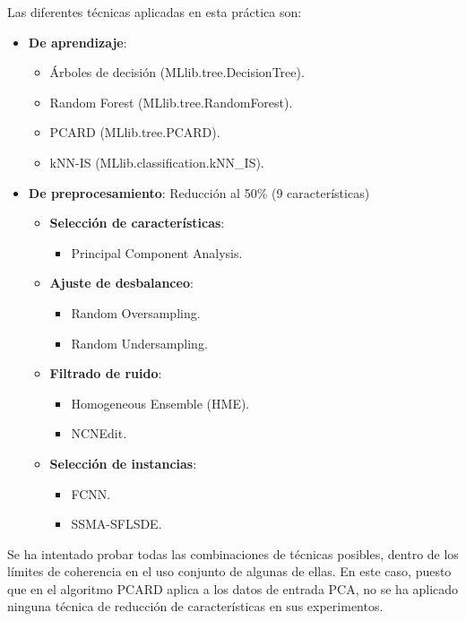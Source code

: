 Las diferentes técnicas aplicadas en esta práctica son:
\begin{itemize}
    \item \textbf{De aprendizaje}: \begin{itemize}
        \item Árboles de decisión (MLlib.tree.DecisionTree).
        \item Random Forest (MLlib.tree.RandomForest).
        \item PCARD (MLlib.tree.PCARD).
        \item kNN-IS (MLlib.classification.kNN\_IS).
    \end{itemize}
    \item \textbf{De preprocesamiento}: Reducción al 50\% (9 características)\begin{itemize}
        \item \textbf{Selección de características}: \begin{itemize}
            \item Principal Component Analysis.
        \end{itemize}
        \item \textbf{Ajuste de desbalanceo}: \begin{itemize}
            \item Random Oversampling.
            \item Random Undersampling.
        \end{itemize}
        \item \textbf{Filtrado de ruido}: \begin{itemize}
            \item Homogeneous Ensemble (HME).
            \item NCNEdit.
        \end{itemize}
        \item \textbf{Selección de instancias}: \begin{itemize}
            \item FCNN.
            \item SSMA-SFLSDE.
        \end{itemize}
    \end{itemize}
\end{itemize}


Se ha intentado probar todas las combinaciones de técnicas posibles, dentro de los límites de coherencia en el uso conjunto de algunas de ellas. En este caso, puesto que en el algoritmo PCARD aplica a los datos de entrada PCA, no se ha aplicado ninguna técnica de reducción de características en sus experimentos.

